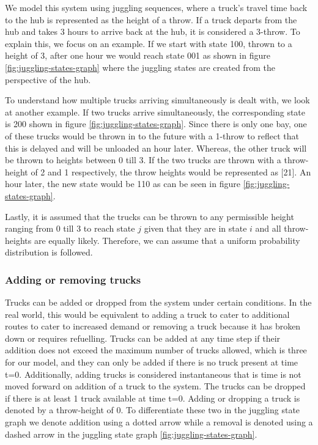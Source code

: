 \documentclass{article}
\theoremstyle{definition}
\theoremstyle{remark}
\numberwithin{equation}{section}
\newcommand{\RedComm}[1]{{\color{red}***#1***}}
\begin{document}
We model this system using juggling sequences, where a truck's travel time back to the hub is represented as the height of a throw. If a truck departs from the hub and takes 3 hours to arrive back at the hub, it is considered a 3-throw. To explain this, we focus on an example. If we start with state 100, thrown to a height of 3, after one hour we would reach state 001 as shown in figure \ref{fig:juggling-states-graph} where the juggling states are created from the perspective of the hub. 

To understand how multiple trucks arriving simultaneously is dealt with, we look at another example. If two trucks arrive simultaneously, the corresponding state is 200 shown in figure \ref{fig:juggling-states-graph}. Since there is only one bay, one of these trucks would be thrown in to the future with a 1-throw to reflect that this is delayed and will be unloaded an hour later. Whereas, the other truck will be thrown to heights between 0 till 3. If the two trucks are thrown with a throw-height of 2 and 1 respectively, the throw heights would be represented as [21]. An hour later, the new state would be 110 as can be seen in figure \ref{fig:juggling-states-graph}. 

Lastly, it is assumed that the trucks can be thrown to any permissible height ranging from 0 till 3 to reach state $j$ given that they are in state $i$ and all throw-heights are equally likely. Therefore, we can assume that a uniform probability distribution is followed. 

\subsubsection{Adding or removing trucks}
Trucks can be added or dropped from the system under certain conditions. In the real world, this would be equivalent to adding a truck to cater to additional routes to cater to increased demand or removing a truck because it has broken down or requires refuelling. 
Trucks can be added at any time step if their addition does not exceed the maximum number of trucks allowed, which is three for our model, and they can only be added if there is no truck present at time t=0. Additionally, adding trucks is considered instantaneous that is time is not moved forward on addition of a truck to the system. The trucks can be dropped if there is at least 1 truck available at time t=0. Adding or dropping a truck is denoted by a throw-height of 0. To differentiate these two in the juggling state graph we denote addition using a dotted arrow while a removal is denoted using a dashed arrow in the juggling state graph \ref{fig:juggling-states-graph}. 
\end{document}
